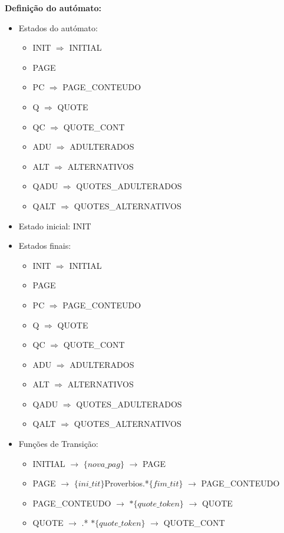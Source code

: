 \documentclass[11pt,a4paper]{report}
\begin{document}
	\vspace{1.0cm}

\textbf{Definição do autómato:}

\begin{itemize}
	\item Estados do autómato:
		\begin{itemize}
			\item INIT $\Rightarrow$ INITIAL
			\item PAGE
			\item PC $\Rightarrow$ PAGE\_CONTEUDO
			\item Q $\Rightarrow$ QUOTE
			\item QC $\Rightarrow$ QUOTE\_CONT
			\item ADU $\Rightarrow$ ADULTERADOS
			\item ALT $\Rightarrow$ ALTERNATIVOS
			\item QADU $\Rightarrow$ QUOTES\_ADULTERADOS
			\item QALT $\Rightarrow$ QUOTES\_ALTERNATIVOS
		\end{itemize}
	\item Estado inicial: INIT
	\item Estados finais:
		\begin{itemize}
			\item INIT $\Rightarrow$ INITIAL
			\item PAGE
			\item PC $\Rightarrow$ PAGE\_CONTEUDO
			\item Q $\Rightarrow$ QUOTE
			\item QC $\Rightarrow$ QUOTE\_CONT
			\item ADU $\Rightarrow$ ADULTERADOS
			\item ALT $\Rightarrow$ ALTERNATIVOS
			\item QADU $\Rightarrow$ QUOTES\_ADULTERADOS
			\item QALT $\Rightarrow$ QUOTES\_ALTERNATIVOS
		\end{itemize}
	\item Funções de Transição:
		\begin{itemize}
			\item INITIAL $\rightarrow$ $\{nova\_pag\}$ $\rightarrow$ PAGE
			\item PAGE $\rightarrow$ $\{ini\_tit\}$Proverbios.*$\{fim\_tit\}$ $\rightarrow$ PAGE\_CONTEUDO
			\item PAGE\_CONTEUDO $\rightarrow$ $*\{quote\_token\}$ $\rightarrow$ QUOTE
			\item QUOTE $\rightarrow$ .* $*\{quote\_token\}$ $\rightarrow$	QUOTE\_CONT

\end{itemize}
\end{itemize}
\end{document}
